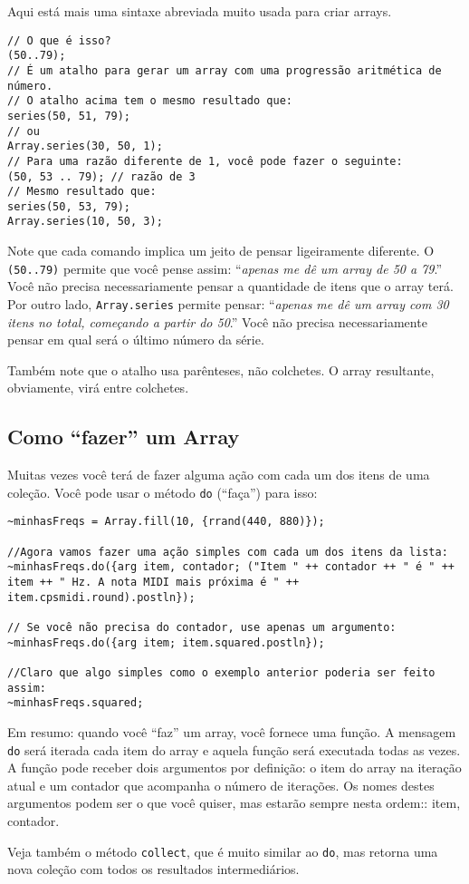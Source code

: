 Aqui está mais uma sintaxe abreviada muito usada para criar arrays.

 
\begin{lstlisting}[style=SuperCollider-IDE, basicstyle=\scttfamily\footnotesize]
// O que é isso?
(50..79);
// É um atalho para gerar um array com uma progressão aritmética de número.
// O atalho acima tem o mesmo resultado que:
series(50, 51, 79);
// ou
Array.series(30, 50, 1);
// Para uma razão diferente de 1, você pode fazer o seguinte:
(50, 53 .. 79); // razão de 3
// Mesmo resultado que:
series(50, 53, 79);
Array.series(10, 50, 3);
\end{lstlisting}

Note que cada comando implica um jeito de pensar ligeiramente diferente. O \texttt{(50..79)} permite que você pense assim: “\emph{apenas me dê um array de 50 a 79}.” Você não precisa necessariamente pensar a quantidade de itens que o array terá. Por outro lado, \texttt{Array.series} permite pensar: “\emph{apenas me dê um array com 30 itens no total, começando a partir do 50}.” Você não precisa necessariamente pensar em qual será o último número da série.

Também note que o atalho usa parênteses, não colchetes. O array resultante, obviamente, virá entre colchetes.
\subsection{Como “fazer” um Array}

Muitas vezes você terá de fazer alguma ação com cada um dos itens de uma coleção. Você pode usar o método \texttt{do} (“faça”) para isso:


\begin{lstlisting}[style=SuperCollider-IDE, basicstyle=\scttfamily\footnotesize]
~minhasFreqs = Array.fill(10, {rrand(440, 880)});

//Agora vamos fazer uma ação simples com cada um dos itens da lista:
~minhasFreqs.do({arg item, contador; ("Item " ++ contador ++ " é " ++ item ++ " Hz. A nota MIDI mais próxima é " ++ item.cpsmidi.round).postln});

// Se você não precisa do contador, use apenas um argumento:
~minhasFreqs.do({arg item; item.squared.postln});

//Claro que algo simples como o exemplo anterior poderia ser feito assim:
~minhasFreqs.squared;
\end{lstlisting}
 

Em resumo: quando você “faz” um array, você fornece uma função. A mensagem \texttt{do} será iterada cada item do array e aquela função será executada todas as vezes. A função pode receber dois argumentos por definição: o item do array na iteração atual e um contador que acompanha o número de iterações. Os nomes destes argumentos podem ser o que você quiser, mas estarão sempre nesta ordem:: item, contador.

Veja também o método \texttt{collect}, que é muito similar ao \texttt{do}, mas retorna uma nova coleção com todos os resultados intermediários.
